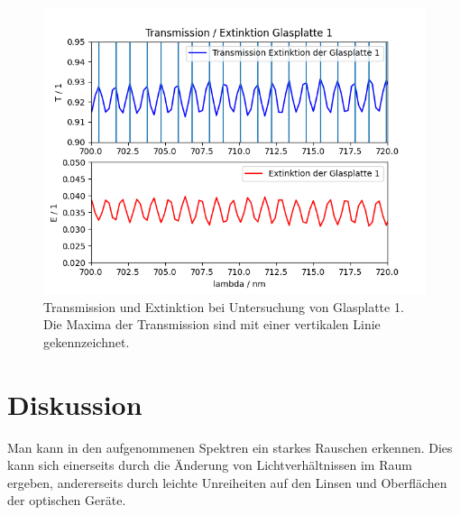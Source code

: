 \documentclass{article}
\begin{document}
\begin{figure}[H]
\centering
\caption{Transmission und Extinktion bei Untersuchung von Glasplatte 1. Die Maxima der Transmission sind mit einer vertikalen Linie gekennzeichnet.}
\label{fig:GP1_ET}
\includegraphics[scale=0.7]{GP1_ET.png}
\end{figure}







\section{Diskussion}

Man kann in den aufgenommenen Spektren ein starkes Rauschen erkennen. Dies kann sich einerseits durch die Änderung von Lichtverhältnissen im Raum ergeben, andererseits durch leichte Unreiheiten auf den Linsen und Oberflächen der optischen Geräte.

\end{document}
